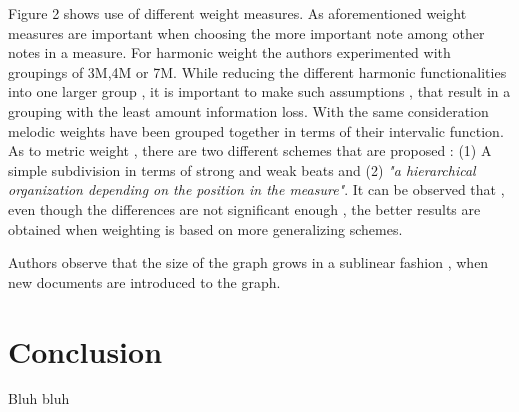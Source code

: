 \documentclass{llncs}
\begin{document}
			Figure 2 shows use of different weight measures. As aforementioned weight measures are important when choosing the more important note among other notes in a measure. For harmonic weight the authors experimented with groupings of 3M,4M or 7M. While reducing the different harmonic functionalities into one larger group , it is important to make such assumptions , that result in a grouping with the least amount information loss. With the same consideration melodic weights have been grouped together in terms of their intervalic function. As to metric weight , there are two different schemes that are proposed : (1) A simple subdivision in terms of strong and weak beats and (2) \textit{"a hierarchical organization depending on the position in the measure"}. It can be observed that , even though the differences are not significant enough , the better results are obtained when weighting is based on more generalizing schemes.

			Authors observe that the size of the graph grows in a sublinear fashion , when new documents are introduced to the graph.   




	\section{Conclusion}
		Bluh bluh
		
	
\end{document}
